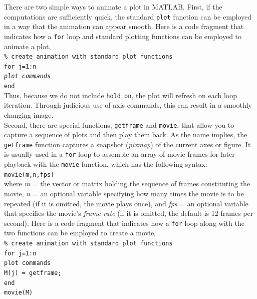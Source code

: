 \documentclass[../main.tex]{subfiles}
\begin{document}
\noindent There are two simple ways to animate a plot in MATLAB. First, if the computations are
sufficiently quick, the standard \texttt{plot} function can be employed in a way that the animation
can appear smooth. Here is a code fragment that indicates how a \texttt{for} loop and standard
plotting functions can be employed to animate a plot,\\

\texttt{\% create animation with standard plot functions\\
\indent for j=1:n\\
\indent \emph{plot commands}\\
\indent end}\\

\noindent Thus, because we do not include \texttt{hold on}, the plot will refresh on each loop iteration.
Through judicious use of axis commands, this can result in a smoothly changing image.\\
\indent Second, there are special functions, \texttt{getframe} and \texttt{movie}, that allow you to capture a
sequence of plots and then play them back. As the name implies, the \texttt{getframe} function
captures a snapshot (\emph{pixmap}) of the current axes or figure. It is usually used in a \texttt{for} loop
to assemble an array of movie frames for later playback with the \texttt{movie} function, which
has the following syntax:\\

\texttt{movie(m,n,fps)}\\

\noindent where \emph{m} = the vector or matrix holding the sequence of frames constituting the movie,
\emph{n} = an optional variable specifying how many times the movie is to be repeated (if it is
omitted, the movie plays once), and \emph{fps} = an optional variable that specifies the
movie's \emph{frame rate} (if it is omitted, the default is 12 frames per second). Here is a code
fragment that indicates how a \texttt{for} loop along with the two functions can be employed
to create a movie,\\

\texttt{\% create animation with standard plot functions\\
\indent for j=1:n\\
\indent\hspace{2mm} plot commands\\
\indent\hspace{2mm} M(j) = getframe;\\
\indent end\\
\indent movie(M)}\\
\end{document}
